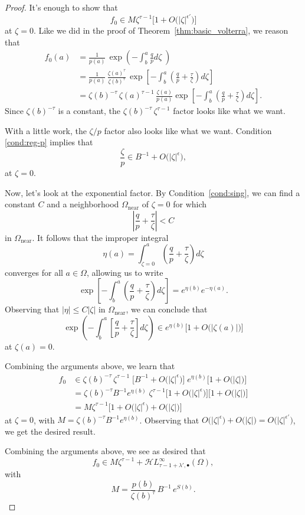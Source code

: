 \documentclass{article}
\theoremstyle{plain}
\newcommand{\singexp}[2]{\mathcal{H}L^\infty_{#1, #2}}
\newcommand{\singexpalg}[1]{\singexp{#1}{\bullet}}
\newcommand{\solproto}{f_0}
\newcommand{\domain}{\Omega}
\begin{document}
\begin{proof}
It's enough to show that
\[ \solproto \in M\zeta^{\tau-1} \Big[1 + O\big(|\zeta|^{\epsilon'}\big)\Big] \]
at $\zeta = 0$. Like we did in the proof of Theorem~\ref{thm:basic_volterra}, we reason that
\begin{align*}
\solproto(a)&=\frac{1}{p(a)}\, \exp\left(-\int_b^a\frac{q}{p} d\zeta\;\right)\\
& = \frac{1}{p(a)}\,\frac{\zeta(a)^{\tau}}{\zeta(b)^{\tau}}\,\exp\left[-\int_b^a \left(\frac{q}{p}+\frac{\tau}{\zeta}\right) d\zeta\right]\\
& = \zeta(b)^{-\tau}\,\zeta(a)^{\tau-1}\,\frac{\zeta(a)}{p(a)} \exp\left[-\int_b^a\left(\frac{q}{p}+\frac{\tau}{\zeta}\right) d\zeta\right].
\end{align*}
Since $\zeta(b)^{-\tau}$ is a constant, the $\zeta(b)^{-\tau}\,\zeta^{\tau-1}$ factor looks like what we want.

With a little work, the $\zeta/p$ factor also looks like what we want. Condition \eqref{cond:reg-p} implies that
\[ \frac{\zeta}{p} \in B^{-1} + O\big(|\zeta|^{\epsilon}\big), \]
at $\zeta = 0$.

Now, let's look at the exponential factor. By Condition~\eqref{cond:sing}, we can find a constant $C$ and a neighborhood $\domain_\text{near}$ of $\zeta = 0$ for which
\[ \left| \frac{q}{p}+\frac{\tau}{\zeta} \right| < C \]
in $\domain_\text{near}$. It follows that the improper integral
\[ \eta(a) = \int_{\zeta = 0}^a \left(\frac{q}{p}+\frac{\tau}{\zeta}\right) d\zeta \]
converges for all $a \in \domain$, allowing us to write
\[ \exp\left[-\int_b^a\left(\frac{q}{p}+\frac{\tau}{\zeta}\right) d\zeta\right] = e^{\eta(b)} e^{-\eta(a)}. \]
Observing that $|\eta| \le C |\zeta|$ in $\domain_\text{near}$, we can conclude that
\[ \exp\left(-\int_b^a\left[\frac{q}{p}+\frac{\tau}{\zeta}\right] d\zeta\right) \in e^{\eta(b)} \Big[ 1 + O\big(|\zeta(a)|\big) \Big] \]
at $\zeta(a) = 0$.

Combining the arguments above, we learn that
\begin{align*}
\solproto & \in \zeta(b)^{-\tau}\,\zeta^{\tau-1}\;\Big[ B^{-1} + O\big(|\zeta|^{\epsilon}\big) \Big]\;e^{\eta(b)} \Big[1 + O\big(|\zeta|\big) \Big] \\
& = \zeta(b)^{-\tau} B^{-1} e^{\eta(b)}\;\zeta^{\tau-1} \Big[ 1 + O\big(|\zeta|^{\epsilon}\big) \Big] \Big[1 + O\big(|\zeta|\big) \Big] \\
& = M\zeta^{\tau-1} \Big[ 1 + O\big(|\zeta|^{\epsilon}\big) + O\big(|\zeta|\big) \Big]
\end{align*}
at $\zeta = 0$, with $M = \zeta(b)^{-\tau} B^{-1} e^{\eta(b)}$. Observing that $O\big(|\zeta|^{\epsilon}\big) + O\big(|\zeta|\big) = O\big(|\zeta|^{\epsilon'}\big)$, we get the desired result.
\par\color{RoyalBlue}
Combining the arguments above, we see as desired that
\[ \solproto \in M\zeta^{\tau - 1} + \singexpalg{\tau-1+\lambda'}(\domain), \]
with 
\[ M = \frac{p(b)}{\zeta(b)^{\tau}}\,B^{-1}\,e^{S(b)}. \]
\end{proof}
\end{document}
